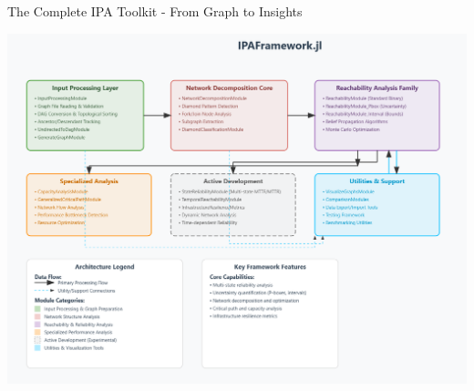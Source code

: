 \documentclass[aspectratio=169]{beamer}
\begin{document}
\begin{frame}{The Complete IPA Toolkit - From Graph to Insights}
\begin{center}
\includegraphics[height=0.83\textheight]{ipa_bigpicture.png}
\end{center}
\end{frame}
\end{document}
